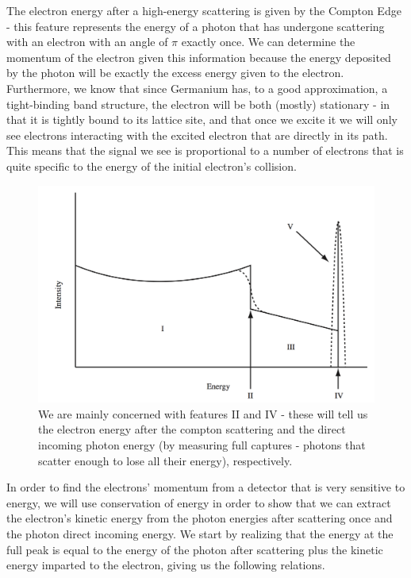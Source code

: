\documentclass[reprint, nobibnotes, amssymb, amsmath, amsfonts, physics, mathtools, mathrsfs, floatfix]{revtex4-1}
\begin{document}
    The electron energy after a high-energy scattering is given by the Compton Edge - this feature represents the energy of a photon that has undergone scattering with an electron with an angle of $\pi$ exactly once.  We can determine the momentum of the electron given this information because the energy deposited by the photon will be exactly the excess energy given to the electron.  Furthermore, we know that since Germanium has, to a good approximation, a tight-binding band structure, the electron will be both (mostly) stationary - in that it is tightly bound to its lattice site, and that once we excite it we will only see electrons interacting with the excited electron that are directly in its path.~\cite{germanium_structure}  This means that the signal we see is proportional to a number of electrons that is quite specific to the energy of the initial electron's collision.

    \begin{figure}[h]
      \centering
      \includegraphics[width=\linewidth]{energy_spectrum.png}
      \caption{We are mainly concerned with features II and IV - these will tell us the electron energy after the compton scattering and the direct incoming photon energy (by measuring full captures - photons that scatter enough to lose all their energy), respectively.~\cite{lab_manual} \label{fig:labeled_spectrum}}
    \end{figure}

    In order to find the electrons' momentum from a detector that is very sensitive to energy, we will use conservation of energy in order to show that we can extract the electron's kinetic energy from the photon energies after scattering once and the photon direct incoming energy.  We start by realizing that the energy at the full peak is equal to the energy of the photon after scattering plus the kinetic energy imparted to the electron, giving us the following relations.
\end{document}
